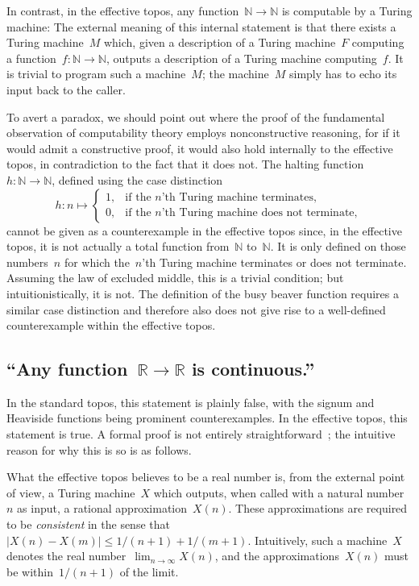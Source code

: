 \documentclass[oneside]{amsart}
\theoremstyle{definition}
\theoremstyle{plain}
\theoremstyle{remark}
\newcommand{\NN}{\mathbb{N}}
\newcommand{\RR}{\mathbb{R}}
\renewcommand{\_}{\mathpunct{.}\,}
\newcommand{\effective}{ef{}fective\xspace}
\newcommand{\?}{\,{:}\,}
\begin{document}
In contrast, in the \effective topos, any function~$\NN \to \NN$ is computable
by a Turing machine: The external meaning of this internal statement is that
there exists a Turing machine~$M$ which, given a description of a Turing
machine~$F$ computing a function~$f : \NN \to \NN$, outputs a description of a
Turing machine computing~$f$. It is trivial to program such a machine~$M$; the
machine~$M$ simply has to echo its input back to the caller.

To avert a paradox, we should point out where the proof of the fundamental
observation of computability theory employs nonconstructive reasoning, for if
it would admit a constructive proof, it would also hold internally to the
\effective topos, in contradiction to the fact that it does not. The halting
function~$h : \NN \to \NN$, defined using the case distinction
\[ h : n \mapsto \begin{cases}
  1, & \text{if the $n$'th Turing machine terminates}, \\
  0, & \text{if the $n$'th Turing machine does not terminate},
\end{cases} \]
cannot be given as a counterexample in the \effective topos since, in the
\effective topos, it is not actually a total function from~$\NN$ to~$\NN$. It
is only defined on those numbers~$n$ for which the~$n$'th Turing machine
terminates or does not terminate. Assuming the law of excluded middle, this is
a trivial condition; but intuitionistically, it is not. The definition of the
busy beaver function requires a similar case distinction and therefore also
does not give rise to a well-defined counterexample within the \effective
topos.


\subsection*{``Any function~$\RR \to \RR$ is continuous.''} In the standard
topos, this statement is plainly false, with the signum and Heaviside functions
being prominent counterexamples. In the \effective topos, this statement is
true. A formal proof is not entirely straightforward~\cite{XXX}; the intuitive
reason for why this is so is as follows.

What the \effective topos believes to be a real number is, from the external
point of view, a Turing machine~$X$ which outputs, when called with a natural
number~$n$ as input, a rational approximation~$X(n)$. These approximations are
required to be \emph{consistent} in the sense that~$|X(n) - X(m)|
\leq 1/(n+1) + 1/(m+1)$. Intuitively, such a machine~$X$ denotes the real
number~$\lim_{n \to \infty} X(n)$, and the approximations~$X(n)$ must be
within~$1/(n+1)$ of the limit.
\end{document}
